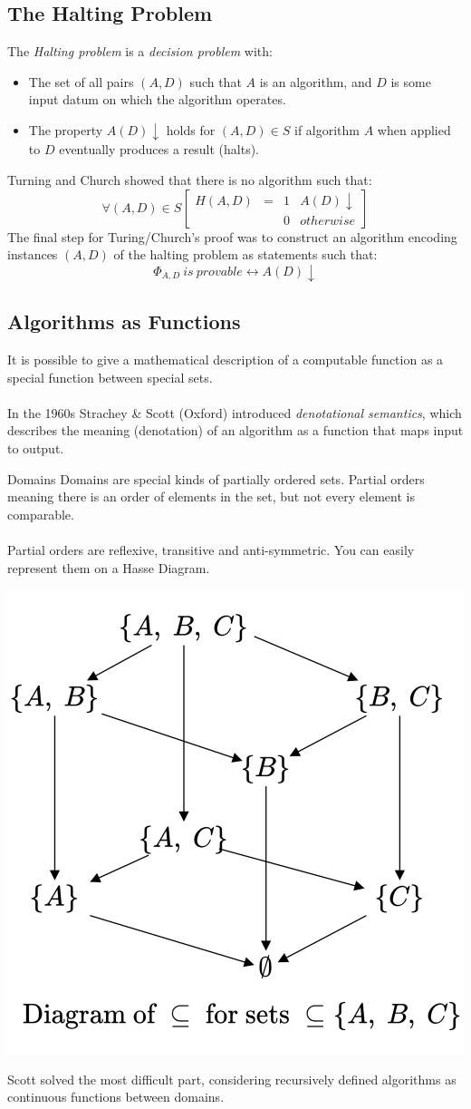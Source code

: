 \subsection{The Halting Problem}
The \textit{Halting problem} is a \textit{decision problem} with:
\begin{itemize}
	\item The set of all pairs $(A,D)$ such that $A$ is an algorithm, and $D$ is some input datum on which the algorithm operates.
	\item The property $A(D)\downarrow$ holds for $(A,D) \in S$ if algorithm $A$ when applied to $D$ eventually produces a result (halts).
\end{itemize}
Turning and Church showed that there is no algorithm such that:
\[\forall (A,D) \in S \begin{bmatrix}
		H (A,D) & = & 1 & A(D)\downarrow \\
		        &   & 0 & otherwise
	\end{bmatrix}\]
The final step for Turing/Church's proof was to construct an algorithm encoding instances $(A,D)$ of the halting problem as statements such that:
\[\Phi_{A,D} \ is \ provable \leftrightarrow A(D)\downarrow\]

\subsection{Algorithms as Functions}
It is possible to give a mathematical description of a computable function as a special function between special sets.
\\
\\ In the 1960s Strachey \& Scott (Oxford) introduced \textit{denotational semantics}, which describes the meaning (denotation)
of an algorithm as a function that maps input to output.
\begin{definitionbox}{Domains}
	Domains are special kinds of partially ordered sets. Partial orders meaning there is an order of elements in the set, but not every element is comparable.
	\\
	\\ Partial orders are reflexive, transitive and anti-symmetric. You can easily represent them on a Hasse Diagram.
	\begin{center}
		\includegraphics[width=.3\textwidth]{introduction/images/hasse_diagram.drawio.png}
	\end{center}
\end{definitionbox}
\noindent 
Scott solved the most difficult part, considering recursively defined algorithms as continuous functions between domains.

